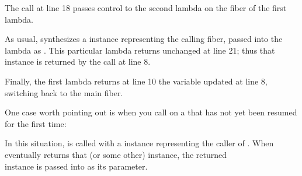 
The  call at line 18 passes control to the second
lambda on the fiber of the first lambda.

As usual, \resumewith synthesizes a \fiber instance representing the calling
fiber, passed into the lambda as . This particular lambda returns 
unchanged at line 21; thus that  instance is returned by the \resume call
at line 8.

Finally, the first lambda returns at line 10 the  variable updated at
line 8, switching back to the main fiber.

One case worth pointing out is when you call \anyresumewith on a
\fiber that has not yet been resumed for the first time:

In this situation,  is called with a \fiber instance
representing the caller of \resumewith. When  eventually
returns that (or some other) \fiber instance, the returned\\
\fiber instance is passed into  as its  parameter.


